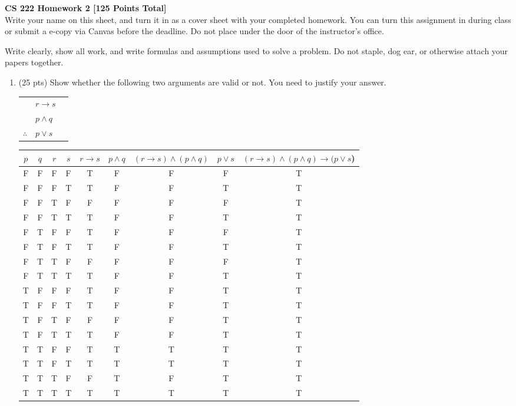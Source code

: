 \documentclass[11pt]{article}
\begin{document}
{\Large {\bf CS 222 Homework 2 [125 Points Total] }}  \\

\noindent Write your name on this sheet, and turn it in as a cover sheet with your completed homework. You can turn this assignment in during class or submit a e-copy via Canvas before the deadline. Do not place under the door of the instructor's office.

\vspace{0.2in}
\noindent Write clearly, show all work, and write formulas and assumptions used to solve a problem. Do not staple, dog ear, or otherwise attach your papers together. 


\begin{enumerate}
  \item (25 pts) Show whether the following two arguments are valid or not. You need to justify your answer.
 
        \begin{tabular}{r l c}
          &  $r \rightarrow s$ & \\
          &  $p \wedge q$ & \\
          \hline
          $\therefore $  &  $p \vee s$
          \end{tabular}
        
        \begin{tabular}{|c c c c|c c|c c|c|}
          \hline
          $p$ & $q$ & $r$ & $s$ & $r \rightarrow s$ & $p \wedge q$ & $(r \rightarrow s) \wedge (p \wedge q)$ & $p \vee s$ & $(r \rightarrow s) \wedge (p \wedge q) \rightarrow (p \vee s$) \\
          \hline
          F & F & F & F & T & F & F & F & T \\
          F & F & F & T & T & F & F & T & T \\
          F & F & T & F & F & F & F & F & T \\
          F & F & T & T & T & F & F & T & T \\
          F & T & F & F & T & F & F & F & T \\ 
          F & T & F & T & T & F & F & T & T \\
          F & T & T & F & F & F & F & F & T \\
          F & T & T & T & T & F & F & T & T \\
          T & F & F & F & T & F & F & T & T \\
          T & F & F & T & T & F & F & T & T \\
          T & F & T & F & F & F & F & T & T \\
          T & F & T & T & T & F & F & T & T \\
          T & T & F & F & T & T & T & T & T \\
          T & T & F & T & T & T & T & T & T \\
          T & T & T & F & F & T & F & T & T \\
          T & T & T & T & T & T & T & T & T \\
          \hline
          \end{tabular}
  

\end{enumerate}
\end{document}
